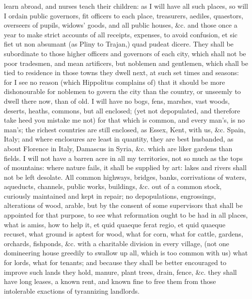 {learn abroad, and nurses teach their children: as I will have all such
places, so will I ordain public governors, fit officers to each
place, treasurers, aediles, quaestors, overseers of pupils, widows'
goods, and all public houses, \&c. and those once a year to make strict
accounts of all receipts, expenses, to avoid confusion, et sic fiet ut
non absumant (as Pliny to Trajan,) quad pudeat dicere. They shall be
subordinate to those higher officers and governors of each city, which
shall not be poor tradesmen, and mean artificers, but noblemen and
gentlemen, which shall be tied to residence in those towns they dwell
next, at such set times and seasons: for I see no reason (which
Hippolitus complains of) that it should be more dishonourable for
noblemen to govern the city than the country, or unseemly to dwell
there now, than of old. I will have no bogs, fens, marshes, vast
woods, deserts, heaths, commons, but all enclosed; (yet not
depopulated, and therefore take heed you mistake me not) for that which
is common, and every man's, is no man's; the richest countries are
still enclosed, as Essex, Kent, with us, \&c. Spain, Italy; and where
enclosures are least in quantity, they are best husbanded, as
about Florence in Italy, Damascus in Syria, \&c. which are liker gardens
than fields. I will not have a barren acre in all my territories, not
so much as the tops of mountains: where nature fails, it shall be
supplied by art: lakes and rivers shall not be left desolate. All
common highways, bridges, banks, corrivations of waters, aqueducts,
channels, public works, buildings, \&c. out of a common stock,
curiously maintained and kept in repair; no depopulations, engrossings,
alterations of wood, arable, but by the consent of some supervisors
that shall be appointed for that purpose, to see what reformation ought
to be had in all places, what is amiss, how to help it, et quid quaeque
ferat regio, et quid quaeque recuset, what ground is aptest for wood,
what for corn, what for cattle, gardens, orchards, fishponds, \&c. with
a charitable division in every village, (not one domineering house
greedily to swallow up all, which is too common with us) what for
lords, what for tenants; and because they shall be better
encouraged to improve such lands they hold, manure, plant trees, drain,
fence, \&c. they shall have long leases, a known rent, and known fine to
free them from those intolerable exactions of tyrannizing landlords.

}
